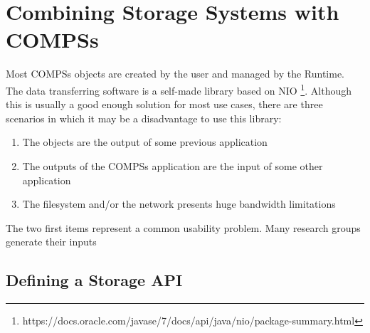\section{Combining Storage Systems with COMPSs}
\label{sec:storage}
Most COMPSs objects are created by the user and managed by the Runtime. The data transferring software is a self-made library based on NIO \footnote{https://docs.oracle.com/javase/7/docs/api/java/nio/package-summary.html}. Although this is usually a good enough solution for most use cases, there are three scenarios in which it may be a disadvantage to use this library:

\begin{enumerate}
\item The objects are the output of some previous application
\item The outputs of the COMPSs application are the input of some other application
\item The filesystem and/or the network presents huge bandwidth limitations
\end{enumerate}

The two first items represent a common usability problem. Many research groups generate their inputs 

\subsection{Defining a Storage API}
\label{subsec:storage_api}

